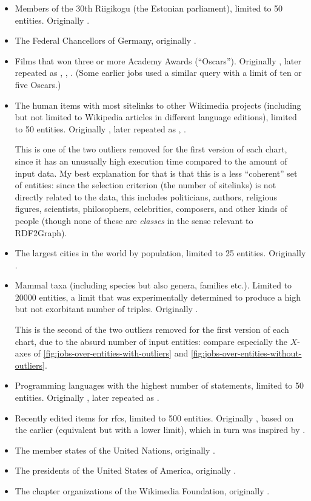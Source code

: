 \begin{itemize}
\item Members of the 30th Riigikogu (the Estonian parliament),
  limited to 50 entities.
  Originally .
\item The Federal Chancellors of Germany,
  originally .
\item Films that won three or more Academy Awards (“Oscars”). %
  Originally , later repeated as , , .
  (Some earlier jobs used a similar query with a limit of ten or five Oscars.)
\item The human items with most sitelinks to other Wikimedia projects
  (including but not limited to Wikipedia articles in different language editions),
  limited to 50 entities.
  Originally , later repeated as , .

  This is one of the two outliers removed for the first version of each chart,
  since it has an unusually high execution time compared to the amount of input data.
  My best explanation for that is that this is a less “coherent” set of entities:
  since the selection criterion (the number of sitelinks) is not directly related to the data,
  this includes politicians, authors, religious figures, scientists, philosophers, celebrities, composers, and other kinds of people
  (though none of these are \emph{classes} in the sense relevant to RDF2Graph).
\item The largest cities in the world by population,
  limited to 25 entities.
  Originally .
\item Mammal taxa (including species but also genera, families etc.).
  Limited to \num{20000} entities,
  a limit that was experimentally determined to produce a high but not exorbitant number of triples.
  Originally .

  This is the second of the two outliers removed for the first version of each chart,
  due to the absurd number of input entities:
  compare especially the $X$-axes of
  \cref{fig:jobs-over-entities-with-outliers} and \cref{fig:jobs-over-entities-without-outliers}.
\item Programming languages with the highest number of statements,
  limited to 50 entities.
  Originally , later repeated as .
\item Recently edited items for \glspl{rfc},
  limited to 500 entities.
  Originally , based on the earlier  (equivalent but with a lower limit),
  which in turn was inspired by .
\item The member states of the United Nations, %
  originally .
\item The presidents of the United States of America,
  originally .
\item The chapter organizations of the Wikimedia Foundation,
  originally .
\end{itemize}

